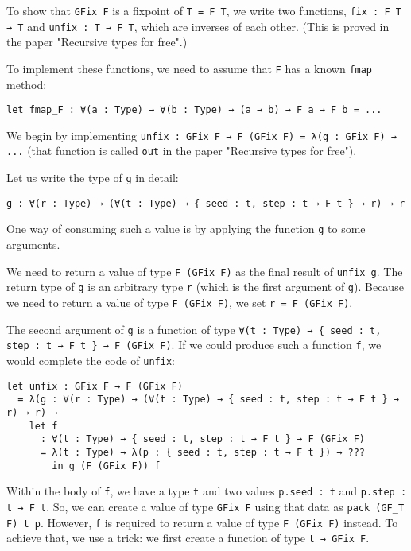 To show that \lstinline!GFix F! is a fixpoint of \lstinline!T = F T!, we write two functions, \lstinline!fix : F T → T! and \lstinline!unfix : T → F T!, which are inverses of each other.
(This is proved in the paper "Recursive types for free".)


To implement these functions, we need to assume that \lstinline!F! has a known \lstinline!fmap! method:


\begin{lstlisting}[language=Dhall]
let fmap_F : ∀(a : Type) → ∀(b : Type) → (a → b) → F a → F b = ...
\end{lstlisting}


We begin by implementing \lstinline!unfix : GFix F → F (GFix F) = λ(g : GFix F) → ...! (that function is called \lstinline!out! in the paper "Recursive types for free").


Let us write the type of \lstinline!g! in detail:


\begin{lstlisting}[language=Dhall]
g : ∀(r : Type) → (∀(t : Type) → { seed : t, step : t → F t } → r) → r
\end{lstlisting}


One way of consuming such a value is by applying the function \lstinline!g! to some arguments.


We need to return a value of type \lstinline!F (GFix F)! as the final result of \lstinline!unfix g!.
The return type of \lstinline!g! is an arbitrary type \lstinline!r! (which is the first argument of \lstinline!g!).
Because we need to return a value of type \lstinline!F (GFix F)!, we set \lstinline!r = F (GFix F)!.


The second argument of \lstinline!g! is a function of type \lstinline!∀(t : Type) → { seed : t, step : t → F t } → F (GFix F)!.
If we could produce such a function \lstinline!f!, we would complete the code of \lstinline!unfix!:


\begin{lstlisting}[language=Dhall]
let unfix : GFix F → F (GFix F)
  = λ(g : ∀(r : Type) → (∀(t : Type) → { seed : t, step : t → F t } → r) → r) →
    let f
      : ∀(t : Type) → { seed : t, step : t → F t } → F (GFix F)
      = λ(t : Type) → λ(p : { seed : t, step : t → F t }) → ???
        in g (F (GFix F)) f
\end{lstlisting}


Within the body of \lstinline!f!, we have a type \lstinline!t! and two values \lstinline!p.seed : t! and \lstinline!p.step : t → F t!.
So, we can create a value of type \lstinline!GFix F! using that data as \lstinline!pack (GF_T F) t p!.
However, \lstinline!f! is required to return a value of type \lstinline!F (GFix F)! instead.
To achieve that, we use a trick: we first create a function of type \lstinline!t → GFix F!.


